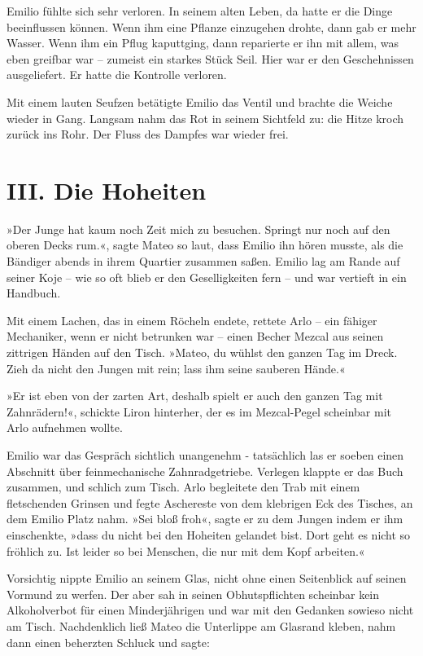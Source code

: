 \bigpar

Emilio fühlte sich sehr verloren. In seinem alten Leben, da hatte
er die Dinge beeinflussen können. Wenn ihm eine Pflanze einzugehen
drohte, dann gab er mehr Wasser. Wenn ihm ein Pflug kaputtging,
dann reparierte er ihn mit allem, was eben greifbar war – zumeist
ein starkes Stück Seil. Hier war er den Geschehnissen ausgeliefert.
Er hatte die Kontrolle verloren.

Mit einem lauten Seufzen betätigte Emilio das Ventil und brachte
die Weiche wieder in Gang. Langsam nahm das Rot in seinem Sichtfeld
zu: die Hitze kroch zurück ins Rohr. Der Fluss des Dampfes war
wieder frei.

\section{III. Die Hoheiten}

»Der Junge hat kaum noch Zeit mich zu besuchen. Springt nur noch
auf den oberen Decks rum.«, sagte Mateo so laut, dass Emilio ihn
hören musste, als die Bändiger abends in ihrem Quartier zusammen
saßen. Emilio lag am Rande auf seiner Koje – wie so oft blieb er
den Geselligkeiten fern – und war vertieft in ein Handbuch.

Mit einem Lachen, das in einem Röcheln endete, rettete Arlo – ein
fähiger Mechaniker, wenn er nicht betrunken war – einen Becher
Mezcal aus seinen zittrigen Händen auf den Tisch. »Mateo, du wühlst
den ganzen Tag im Dreck. Zieh da nicht den Jungen mit rein; lass
ihm seine sauberen Hände.«

»Er ist eben von der zarten Art, deshalb spielt er auch den ganzen
Tag mit Zahnrädern!«, schickte Liron hinterher, der es im
Mezcal-Pegel scheinbar mit Arlo aufnehmen wollte.

\bigpar

Emilio war das Gespräch sichtlich unangenehm - tatsächlich las er
soeben einen Abschnitt über feinmechanische Zahnradgetriebe.
Verlegen klappte er das Buch zusammen, und schlich zum Tisch. Arlo
begleitete den Trab mit einem fletschenden Grinsen und fegte
Aschereste von dem klebrigen Eck des Tisches, an dem Emilio Platz
nahm. »Sei bloß froh«, sagte er zu dem Jungen indem er ihm
einschenkte, »dass du nicht bei den Hoheiten gelandet bist. Dort
geht es nicht so fröhlich zu. Ist leider so bei Menschen, die nur
mit dem Kopf arbeiten.«

Vorsichtig nippte Emilio an seinem Glas, nicht ohne einen
Seitenblick auf seinen Vormund zu werfen. Der aber sah in seinen
Obhutspflichten scheinbar kein Alkoholverbot für einen
Minderjährigen und war mit den Gedanken sowieso nicht am Tisch.
Nachdenklich ließ Mateo die Unterlippe am Glasrand kleben, nahm
dann einen beherzten Schluck und sagte:

